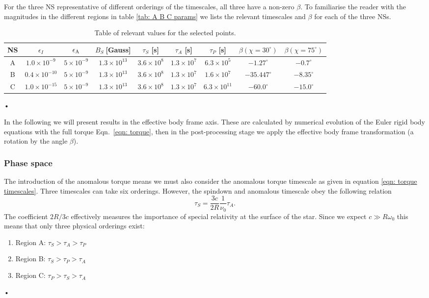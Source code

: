 \documentclass[../full_thesis/full_thesis.tex]{subfiles}
\begin{document}
For the three NS representative of different orderings of the timescales, all
three have a non-zero $\beta$. To familiarise the reader with the magnitudes in
the different regions in table \ref{tab: A B C params} we lists the relevant
timescales and $\beta$ for each of the three NSs.
\begin{table}[ht]
{\footnotesize
\centering
	\begin{tabular}[ht]{|c|c|c|c|c|c|c|c|c|}\hline
NS &  $\epsilon_{I}$  & $\epsilon_{\mathrm{A}} $ & 	$B_{S} \; $[Gauss] & $\tau_{S}$ [s] & $\tau_{A}$ [s] & $ \tau_{P}$  [s] & $\beta (\chi=30^{\circ})$ & $\beta(\chi=75^{\circ})$ \\ \hline
A & $  1.0\times 10^{-9}  $ & $  5\times 10^{-9}  $ & $  1.3\times 10^{13}  $ & $  3.6\times 10^{8}  $ & $  1.3\times 10^{7}  $ & $  6.3\times 10^{5}  $ & $ -1.27^{\circ} $& $ -0.7^{\circ} $ \\
B & $  0.4\times 10^{-10}  $ & $  5\times 10^{-9}  $ & $  1.3\times 10^{13}  $ & $  3.6\times 10^{8}  $ & $  1.3\times 10^{7}  $ & $  1.6\times 10^{7}  $ & $ -35.447^{\circ} $& $ -8.35^{\circ} $ \\
C & $  1.0\times 10^{-15}  $ & $  5\times 10^{-9}  $ & $  1.3\times 10^{13}  $ & $  3.6\times 10^{8}  $ & $  1.3\times 10^{7}  $ & $  6.3\times 10^{11}  $ & $ -60.0^{\circ} $& $ -15.0^{\circ} $ \\ \hline
	\end{tabular}•}
\caption{Table of relevant values for the selected points. }
\label{tab: A B C params beta}
\end{table}

In the following we will present results in the effective body frame axis. These
are calculated by numerical evolution of the Euler rigid body equations with the full
torque Eqn.~\eqref{eqn: torque}, then in the post-processing stage we apply the
effective body frame transformation (a rotation by the angle $\beta$).

\subsubsection{Phase space}

The introduction of the anomalous torque means we must also consider the
anomalous torque timescale as given in equation \eqref{eqn: torque timescales}. Three
timescales can take six orderings. However, the spindown and anomalous timescale
obey the following relation
\begin{equation}
\tau_{S} = \frac{3c}{2R}\frac{1}{\nu_{0}}\tau_{A}.
\end{equation}
The coefficient $2R/3c$ effectively measures the importance of special
relativity at the surface of the star. Since we expect $c\gg R \omega_{0}$ this
means that only three physical orderings exist:
\begin{enumerate}
\item Region A: $\tau_{S}>\tau_{A}> \tau_{P}$
\item Region B: $\tau_{S}>\tau_{P}> \tau_{A}$
\item Region C: $\tau_{P}>\tau_{S}> \tau_{A}$
\end{enumerate}•
\end{document}
